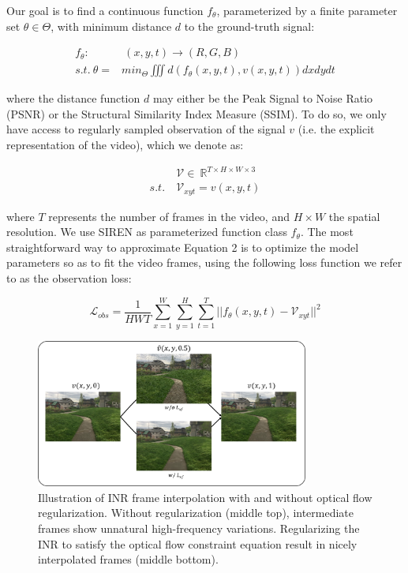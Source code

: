 \documentclass{article}
\begin{document}
Our goal is to find a continuous function $f_{\theta}$, parameterized by a finite parameter set $\theta \in \Theta$,
with minimum distance $d$ to the ground-truth signal:

\begin{equation}
\begin{aligned}
f_{\theta}:& \:(x, y, t) \rightarrow (R, G, B) \\
s.t. \: \theta =& min_{\Theta} \iiint d(f_{\theta}(x,y,t), v(x,y,t)) dx dy dt
\end{aligned}
\end{equation}

where the distance function $d$ may either be the Peak Signal to Noise Ratio (PSNR) or the Structural Similarity Index Measure (SSIM).
To do so, we only have access to regularly sampled observation of the signal $v$
(i.e. the explicit representation of the video), which we denote as:

\begin{equation}
\begin{aligned}
&\mathcal{V} \in  \: \mathbb{R}^{T \times H \times W \times 3} \\
s.t. \: &\mathcal{V}_{xyt} =   v(x, y, t) %
\end{aligned}
\end{equation}

where $T$ represents the number of frames in the video, and $H \times W$ the spatial resolution.
We use SIREN as parameterized function class $f_{\theta}$.
The most straightforward way to approximate Equation 2 is to optimize the model parameters so as to fit the video frames,
using the following loss function we refer to as the observation loss:

\begin{equation}
\mathcal{L}_{obs} = \frac{1}{HWT} \sum_{x=1}^W\sum_{y=1}^H\sum_{t=1}^T || f_{\theta}(x,y,t) - \mathcal{V}_{xyt} ||^2
\end{equation}

\begin{figure}[t]
\centering
\includegraphics[width=0.8\textwidth]{"w_wo_OF"}
\caption{Illustration of INR frame interpolation with and without optical flow regularization.
Without regularization (middle top), intermediate frames show unnatural high-frequency variations.
Regularizing the INR to satisfy the optical flow constraint equation result in nicely interpolated frames (middle bottom).
}
\label{fig_w_wo_OF}
\end{figure}
\end{document}
